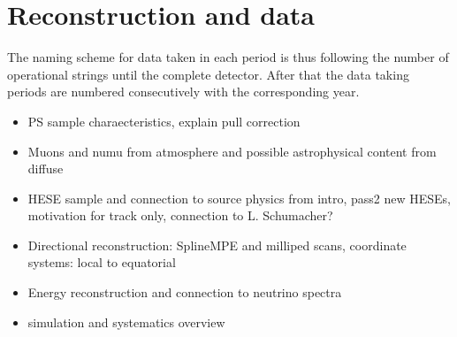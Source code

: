 \chapter{Reconstruction and data}

The naming scheme for data taken in each period is thus following the number of operational strings until the complete detector.
After that the data taking periods are numbered consecutively with the corresponding year.


\begin{itemize}
  \item PS sample charaecteristics, explain pull correction
  \item Muons and numu from atmosphere and possible astrophysical content from diffuse
  \item HESE sample and connection to source physics from intro, pass2 new HESEs, motivation for track only, connection to L. Schumacher?
  \item Directional reconstruction: SplineMPE and milliped scans, coordinate systems: local to equatorial
  \item Energy reconstruction and connection to neutrino spectra
  \item simulation and systematics overview
\end{itemize}